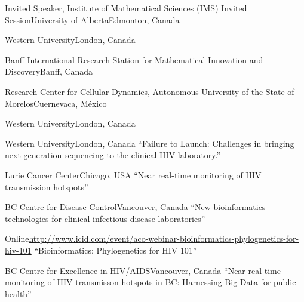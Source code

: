 \documentclass[11pt]{moderncv}
\begin{document}
{Invited Speaker, Institute of Mathematical Sciences (IMS) Invited Session}{University of Alberta}{Edmonton, Canada}{}


{Western University}{London, Canada}{}

{Banff International Research Station for Mathematical Innovation and Discovery}{Banff, Canada}{}

{Research Center for Cellular Dynamics, Autonomous University of the State of Morelos}{Cuernevaca, M\'exico}{}

{Western University}{London, Canada}
{}

{Western University}{London, Canada}
{``Failure to Launch: Challenges in bringing next-generation sequencing to the clinical HIV laboratory.''}

{}

{Lurie Cancer Center}{Chicago, USA}
{``Near real-time monitoring of HIV transmission hotspots''}

{BC Centre for Disease Control}{Vancouver, Canada}
{``New bioinformatics technologies for clinical infectious disease laboratories''}

{Online}{\url{http://www.icid.com/event/aco-webinar-bioinformatics-phylogenetics-for-hiv-101}}
{``Bioinformatics: Phylogenetics for HIV 101''}

{BC Centre for Excellence in HIV/AIDS}{Vancouver, Canada}
{``Near real-time monitoring of HIV transmisson hotspots in BC: Harnessing Big Data for public health''}
\end{document}
